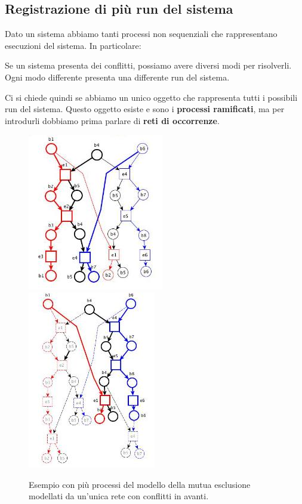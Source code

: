 \subsection{Registrazione di più run del sistema}
Dato un sistema abbiamo tanti processi non sequenziali che rappresentano esecuzioni
del sistema. In particolare:
\begin{definizione}
  Se un sistema presenta dei conflitti, possiamo avere diversi modi per risolverli. Ogni modo differente presenta una differente run del sistema.
\end{definizione}
Ci si chiede quindi se abbiamo un unico oggetto che rappresenta tutti i
possibili run del sistema. Questo oggetto esiste e sono i \textbf{processi ramificati}, ma per introdurli dobbiamo prima parlare di \textbf{reti di occorrenze}.
\begin{figure}[H]
  \centering
  \includegraphics[scale = 0.6]{img/be4.jpg}
  \includegraphics[scale = 0.6]{img/be5.jpg} 
  \caption{Esempio con più processi del modello della mutua esclusione
    modellati da un’unica rete con conflitti in avanti.}
\end{figure}
